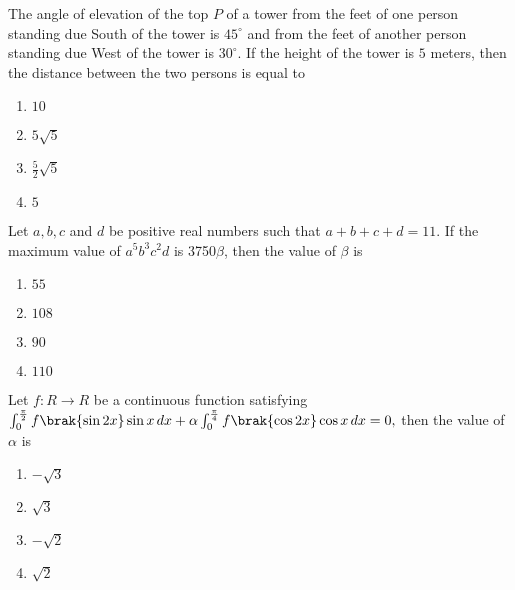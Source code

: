 \iffalse
\title{Assignment}
\author{K.AKSHAY TEJA}
\section{mcq-single}
\fi
\item The angle of elevation of the top $P$ of a tower from the feet of one person standing due South of the tower is $45^\circ$ and from the feet of another person standing due West of the tower is $30^\circ$. If the height of the tower is $5$ meters, then the distance  between the two persons is equal to \hfill {}

\begin{multicols}{4}
\begin{enumerate}
    \item $10$
    \item $5 \sqrt{5}$
    \item $\frac{5}{2}\sqrt{5}$
    \item $5$
\end{enumerate}
\end{multicols}

\item Let $a, b, c$ and $d$ be positive real numbers such that $a + b + c + d = 11$. If the maximum value of $a^5 b^3 c^2 d$ is 3750$\beta$, then the value of $\beta$ is \hfill {}
\begin{multicols}{4}
\begin{enumerate}
    \item $55$
    \item $108$
    \item $90$
    \item $110$
\end{enumerate}
\end{multicols}



\item Let $f: R \to R$ be a continuous function satisfying $\int_0^{\frac{\pi}{2}} f\brak{\sin 2x} \sin x \, dx + \alpha\int_0^{\frac{\pi}{4}} f\brak{\cos 2x} \cos x \, dx = 0,$ then the value of $\alpha$ is \hfill {}
\begin{multicols}{4}
\begin{enumerate}
    \item $-\sqrt{3}$ 
    \item $\sqrt{3}$ 
    \item $-\sqrt{2}$ 
    \item $\sqrt{2}$ 
\end{enumerate}
\end{multicols}



